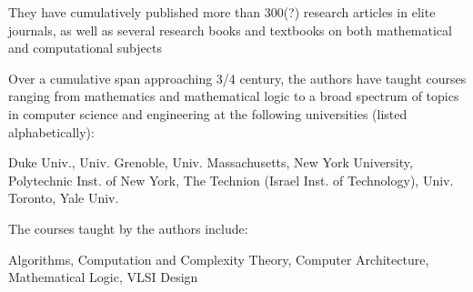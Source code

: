 \documentclass{article}[12pt]
\begin{document}
\smallskip

\noindent
They have cumulatively published more than 300(?) research articles in elite journals, as well as several research books and textbooks on both mathematical and computational subjects

\bigskip

\noindent
Over a cumulative span approaching 3/4 century, the authors have taught courses ranging from mathematics and mathematical logic to a broad spectrum of topics in computer science and engineering at the following universities (listed alphabetically):

\smallskip

\noindent
Duke Univ., 
Univ. Grenoble,
Univ. Massachusetts,
New York University,
Polytechnic Inst. of New York,
The Technion (Israel Inst. of Technology),
Univ. Toronto,
Yale Univ.

\smallskip

\noindent
The courses taught by the authors include:

\smallskip

\noindent
Algorithms,
Computation and Complexity Theory,
Computer Architecture,
Mathematical Logic,
VLSI Design
\end{document}
